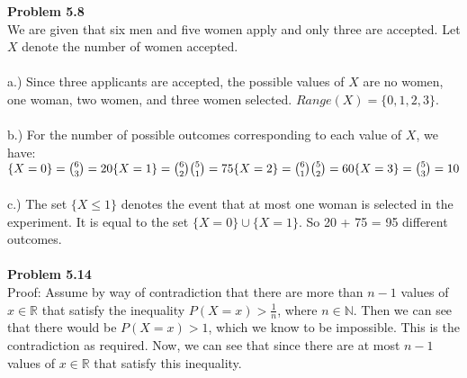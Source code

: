 \documentclass{article}
\begin{document}
\noindent\textbf{Problem 5.8}\\
We are given that six men and five women apply and only three are accepted. Let $X$ denote the number of women accepted.
\\\\
a.) Since three applicants are accepted, the possible values of $X$ are no women, one woman, two women, and three women selected. $Range(X) = \{0,1,2,3\}$.
\\\\
b.) For the number of possible outcomes corresponding to each value of $X$, we have: 
$
\\
    \{X=0\} = \binom{6}{3} = 20
\\
    \{X=1\} = \binom{6}{2}\binom{5}{1} = 75
\\
    \{X=2\} = \binom{6}{1}\binom{5}{2} = 60
\\
    \{X=3\} = \binom{5}{3} = 10$
\\
\\
c.) The set $\{X\leq 1\}$ denotes the event that at most one woman is selected in the experiment. It is equal to the set $\{X=0\}\cup \{X=1\}$. So 20 + 75 = 95 different outcomes. 
\\\\
\noindent\textbf{Problem 5.14}\\
Proof: Assume by way of contradiction that there are more than $n-1$ values of $x \in \mathbb{R}$ that satisfy the inequality $P(X=x)> \frac{1}{n}$, where $n\in \mathbb{N}$. Then we can see that there would be $P(X=x)>1$, which we know to be impossible. This is the contradiction as required. Now, we can see that since there are at most $n-1$ values of $x\in\mathbb{R}$ that satisfy this inequality.
\end{document}
